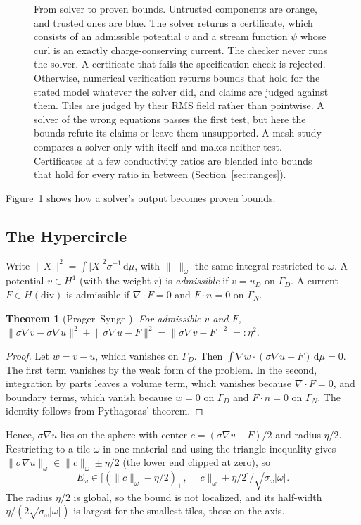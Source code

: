 \documentclass[11pt]{article}
\newtheorem{theorem}{Theorem}
\newcommand{\dmu}{\,\mathrm{d}\mu}
\newcommand{\norm}[1]{\lVert #1\rVert}
\begin{document}
\begin{figure}[t]
\caption{From solver to proven bounds. Untrusted components are orange, and trusted
ones are blue. The solver returns a certificate, which consists of an admissible
potential $v$ and a stream function $\psi$ whose curl is an exactly
charge-conserving current. The checker never
runs the solver. A certificate that fails the specification check is rejected.
Otherwise, numerical verification returns bounds that hold for the stated model
whatever the solver did, and claims are judged against them. Tiles are judged by
their RMS field rather than pointwise. A solver of the wrong equations passes the first
test, but here the bounds refute its claims or leave them unsupported. A mesh study
compares a solver only with itself and makes neither test. Certificates at a few
conductivity ratios are blended into bounds that hold for every ratio in between
(Section~\ref{sec:ranges}).}
\label{fig:process}
\end{figure}

Figure~\ref{fig:process} shows how a solver's output becomes proven bounds.

\subsection{The Hypercircle}
Write $\norm{X}^2 = \int |X|^2\sigma^{-1}\dmu$, with $\norm{\cdot}_\omega$ the same
integral restricted to $\omega$. A potential $v\in H^1$ (with the weight $r$)
is \emph{admissible} if $v=u_D$ on $\Gamma_D$. A current $F\in H(\mathrm{div})$
is admissible if $\nabla\cdot F = 0$ and $F\cdot n=0$ on $\Gamma_N$.

\begin{theorem}[Prager--Synge \cite{pragersynge1947}]\label{thm:ps}
For admissible $v$ and $F$,
$\norm{\sigma\nabla v-\sigma\nabla u}^2+\norm{\sigma\nabla u-F}^2
=\norm{\sigma\nabla v-F}^2=:\eta^2$.
\end{theorem}
\begin{proof}
Let $w=v-u$, which vanishes on $\Gamma_D$. Then
$\int\nabla w\cdot(\sigma\nabla u-F)\dmu = 0$. The first term vanishes by the
weak form of the problem. In the second, integration by parts leaves a volume
term, which vanishes because $\nabla\cdot F=0$, and boundary terms, which vanish
because $w=0$ on $\Gamma_D$ and $F\cdot n=0$ on $\Gamma_N$. The identity
follows from Pythagoras' theorem.
\end{proof}
Hence, $\sigma\nabla u$ lies on the sphere with center $c=(\sigma\nabla v+F)/2$
and radius $\eta/2$. Restricting to a tile $\omega$ in one material and using
the triangle inequality gives $\norm{\sigma\nabla u}_\omega\in\norm{c}_\omega\pm\eta/2$
(the lower end clipped at zero), so
\begin{equation}\label{eq:tile}
E_\omega\in\bigl[(\norm{c}_\omega-\eta/2)_+,\ \norm{c}_\omega+\eta/2\bigr]\big/\sqrt{\sigma_\omega|\omega|}.
\end{equation}
The radius $\eta/2$ is global, so the bound is not localized, and its
half-width $\eta/(2\sqrt{\sigma_\omega|\omega|})$ is largest for the smallest
tiles, those on the axis.
\end{document}
